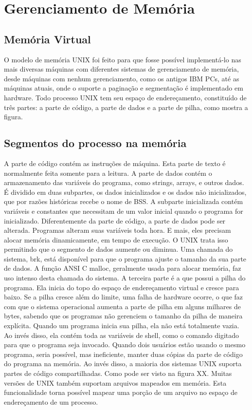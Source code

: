 \chapter{Gerenciamento de Memória}
\section{Memória Virtual}
O modelo de memória UNIX foi feito para que fosse possível implementá-lo nas mais diversas máquinas com diferentes sistemas de gerenciamento de memória, desde máquinas com nenhum gerenciamento, como os antigos IBM PCs, até as máquinas atuais, onde o suporte a paginação e segmentação é implementado em hardware. Todo processo UNIX tem seu espaço de endereçamento, constituído de três partes: a parte de código, a parte de dados e a parte de pilha, como mostra a figura.

\section{Segmentos do processo na memória}

A parte de código contém as instruções de máquina. Esta parte de texto é normalmente feita somente para a leitura.
A parte de dados contém o armazenamento das variáveis do programa, como strings, arrays, e outros dados. É dividido em duas subpartes, os dados inicializados e os dados não inicializados, que por razões históricas recebe o nome de BSS. A subparte inicializada contém variáveis e constantes que necessitam de um valor inicial quando o programa for inicializado.
Diferentemente da parte de código, a parte de dados pode ser alterada. Programas alteram suas variáveis toda hora. E mais, eles precisam alocar memória dinamicamente, em tempo de execução. O UNIX trata isso permitindo que o segmento de dados aumente ou diminua. Uma chamada do sistema, brk, está disponível para que o programa ajuste o tamanho da sua parte de dados. A função ANSI C malloc, geralmente usada para alocar memória, faz uso intenso desta chamada do sistema.
A terceira parte é a que possui a pilha do programa. Ela inicia do topo do espaço de endereçamento virtual e cresce para baixo. Se a pilha cresce além do limite, uma falha de hardware ocorre, o que faz com que o sistema operacional aumenta a parte de pilha em alguns milhares de bytes, sabendo que os programas não gerenciem o tamanho da pilha de maneira explícita. Quando um programa inicia sua pilha, ela não está totalmente vazia. Ao invés disso, ela contém toda as variáveis de shell, como o comando digitado para que o programa seja invocado.
Quando dois usuários estão usando o mesmo programa, seria possível, mas ineficiente, manter duas cópias da parte de código do programa na memória. Ao invés disso, a maioria dos sistemas UNIX suporta partes de código compartilhadas. Como pode ser visto na figura XX.
Muitas versões de UNIX também suportam arquivos mapeados em memória. Esta funcionalidade torna possível mapear uma porção de um arquivo no espaço de endereçamento de um processo.

